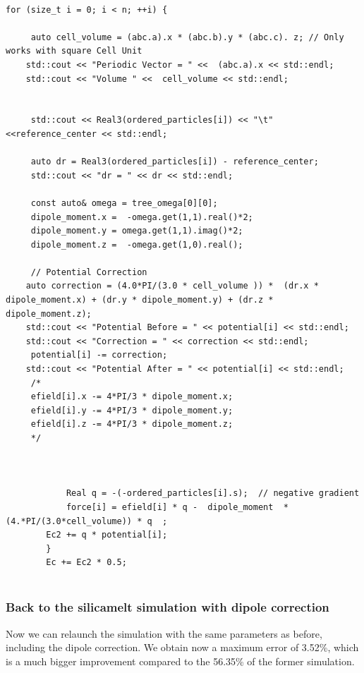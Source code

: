 \documentclass[11pt,twoside,a4paper]{report}
\begin{document}
	\begin{lstlisting}

for (size_t i = 0; i < n; ++i) {

	 auto cell_volume = (abc.a).x * (abc.b).y * (abc.c). z; // Only works with square Cell Unit
	std::cout << "Periodic Vector = " <<  (abc.a).x << std::endl;
	std::cout << "Volume " <<  cell_volume << std::endl;


	 std::cout << Real3(ordered_particles[i]) << "\t" <<reference_center << std::endl;

	 auto dr = Real3(ordered_particles[i]) - reference_center;
	 std::cout << "dr = " << dr << std::endl;

	 const auto& omega = tree_omega[0][0];
     dipole_moment.x =  -omega.get(1,1).real()*2;
	 dipole_moment.y = omega.get(1,1).imag()*2;
	 dipole_moment.z =  -omega.get(1,0).real();

	 // Potential Correction
	auto correction = (4.0*PI/(3.0 * cell_volume )) *  (dr.x * dipole_moment.x) + (dr.y * dipole_moment.y) + (dr.z * dipole_moment.z);
	std::cout << "Potential Before = " << potential[i] << std::endl;
	std::cout << "Correction = " << correction << std::endl;
	 potential[i] -= correction;
	std::cout << "Potential After = " << potential[i] << std::endl;
	 /*
	 efield[i].x -= 4*PI/3 * dipole_moment.x;
	 efield[i].y -= 4*PI/3 * dipole_moment.y;
	 efield[i].z -= 4*PI/3 * dipole_moment.z;
	 */



            Real q = -(-ordered_particles[i].s);  // negative gradient
            force[i] = efield[i] * q -  dipole_moment  * (4.*PI/(3.0*cell_volume)) * q  ;
	    Ec2 += q * potential[i];
        }
        Ec += Ec2 * 0.5;


\end{lstlisting}
	
\subsubsection{Back to the silicamelt simulation with dipole correction}

Now we can relaunch the simulation with the same parameters as before, including the dipole correction.
We obtain now a maximum error of 3.52\%, which is a much bigger improvement compared to the 56.35\% of the former simulation.
\end{document}
